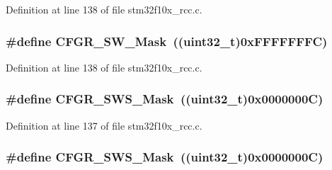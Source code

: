 Definition at line 138 of file stm32f10x\+\_\+rcc.\+c.

\subsubsection[{\texorpdfstring{C\+F\+G\+R\+\_\+\+S\+W\+\_\+\+Mask}{CFGR_SW_Mask}}]{\setlength{\rightskip}{0pt plus 5cm}\#define C\+F\+G\+R\+\_\+\+S\+W\+\_\+\+Mask~(({\bf uint32\+\_\+t})0x\+F\+F\+F\+F\+F\+F\+F\+C)}\hypertarget{group___r_c_c___private___defines_ga41e0b286664f76c2057cffb134809c51}{}\label{group___r_c_c___private___defines_ga41e0b286664f76c2057cffb134809c51}


Definition at line 138 of file stm32f10x\+\_\+rcc.\+c.

\subsubsection[{\texorpdfstring{C\+F\+G\+R\+\_\+\+S\+W\+S\+\_\+\+Mask}{CFGR_SWS_Mask}}]{\setlength{\rightskip}{0pt plus 5cm}\#define C\+F\+G\+R\+\_\+\+S\+W\+S\+\_\+\+Mask~(({\bf uint32\+\_\+t})0x0000000\+C)}\hypertarget{group___r_c_c___private___defines_gaefba904c88a72c7e2c12e8fcef38300a}{}\label{group___r_c_c___private___defines_gaefba904c88a72c7e2c12e8fcef38300a}


Definition at line 137 of file stm32f10x\+\_\+rcc.\+c.

\subsubsection[{\texorpdfstring{C\+F\+G\+R\+\_\+\+S\+W\+S\+\_\+\+Mask}{CFGR_SWS_Mask}}]{\setlength{\rightskip}{0pt plus 5cm}\#define C\+F\+G\+R\+\_\+\+S\+W\+S\+\_\+\+Mask~(({\bf uint32\+\_\+t})0x0000000\+C)}\hypertarget{group___r_c_c___private___defines_gaefba904c88a72c7e2c12e8fcef38300a}{}\label{group___r_c_c___private___defines_gaefba904c88a72c7e2c12e8fcef38300a}


